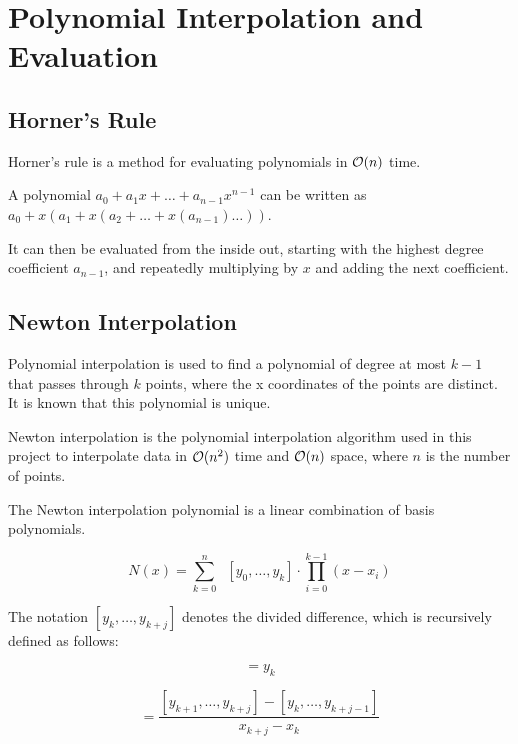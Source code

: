 \chapter{Polynomial Interpolation and Evaluation}

\section{Horner's Rule}

Horner's rule is a method for evaluating polynomials in $\mathcal{O}(n)$ time.

A polynomial $a_0 + a_1 x + \ldots + a_{n-1} x^{n-1}$ can be written as $a_0 + x(a_1 + x(a_2 + \ldots + x(a_{n-1}) \ldots))$.

It can then be evaluated from the inside out, starting with the highest degree coefficient $a_{n-1}$,
and repeatedly multiplying by $x$ and adding the next coefficient.

\section{Newton Interpolation}

Polynomial interpolation is used to find a polynomial of degree at most $k - 1$ that passes through $k$ points, where the x coordinates of the points are distinct.
It is known that this polynomial is unique.

Newton interpolation is the polynomial interpolation algorithm used in this project to interpolate data in $\mathcal{O}(n^2)$ time and $\mathcal{O}(n)$ space, where $n$ is the number of points.

The Newton interpolation polynomial is a linear combination of basis polynomials.

\begin{equation}
    N(x) = \sum_{k=0}^{n} \;\; [y_0, \ldots, y_k] \cdot \prod_{i=0}^{k-1} (x - x_i)
\end{equation}

The notation $[y_k, \ldots, y_{k+j}]$ denotes the divided difference, which is recursively defined as follows:

\begin{equation}
    [y_k] = y_k
\end{equation}

\begin{equation}
    [y_k, \ldots, y_{k+j}] = \frac{[y_{k+1}, \ldots, y_{k+j}] - [y_k, \ldots, y_{k+j-1}]}{x_{k+j} - x_k}
\end{equation}

